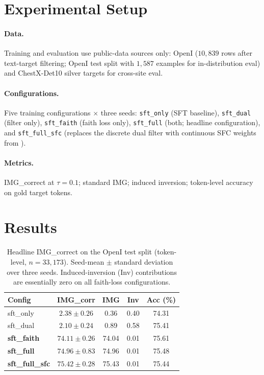 \documentclass{article}
\begin{document}
\section{Experimental Setup}
\label{sec:setup}

\paragraph{Data.} Training and evaluation use public-data sources
only: OpenI \citep{demner2016openi} ($10{,}839$ rows after
text-target filtering; OpenI test split with $1{,}587$ examples
for in-distribution eval) and ChestX-Det10 silver targets
\citep{liu2020chestxdet} for cross-site eval.

\paragraph{Configurations.} Five training configurations $\times$
three seeds: \texttt{sft\_only} (SFT baseline), \texttt{sft\_dual}
(filter only), \texttt{sft\_faith} (faith loss only),
\texttt{sft\_full} (both; headline configuration), and
\texttt{sft\_full\_sfc} (replaces the discrete dual filter with
continuous SFC weights from \citealp{li2025sfc}).

\paragraph{Metrics.} IMG\_correct at $\tau = 0.1$; standard IMG;
induced inversion; token-level accuracy on gold target tokens.

\section{Results}
\label{sec:results}

\begin{table}[t]
\centering
\small
\setlength{\tabcolsep}{2.6pt}
\caption{Headline IMG\_correct on the OpenI test split
(token-level, $n = 33{,}173$). Seed-mean $\pm$ standard deviation
over three seeds. Induced-inversion (Inv) contributions are
essentially zero on all faith-loss configurations.}
\label{tab:headline}
\begin{tabular}{lcccc}
\toprule
\textbf{Config} & \textbf{IMG\_corr} & \textbf{IMG} & \textbf{Inv} & \textbf{Acc (\%)}\\
\midrule
sft\_only         & $2.38\pm0.26$  & 0.36  & 0.40 & 74.31 \\
sft\_dual         & $2.10\pm0.24$  & 0.89  & 0.58 & 75.41 \\
\textbf{sft\_faith}    & $\mathbf{74.11\pm0.26}$ & 74.04 & 0.01 & 75.61 \\
\textbf{sft\_full}     & $\mathbf{74.96\pm0.83}$ & 74.96 & 0.01 & 75.48 \\
\textbf{sft\_full\_sfc}& $\mathbf{75.42\pm0.28}$ & 75.43 & 0.01 & 75.44 \\
\bottomrule
\end{tabular}
\end{table}
\end{document}
